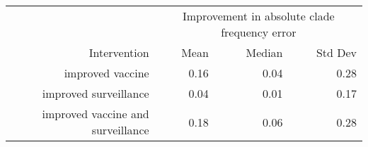 
\begin{tabular*}{0.7\textwidth}{rrrr}
\toprule
             & \multicolumn{3}{c}{Improvement in absolute clade frequency error} \\
Intervention & Mean & Median & Std Dev \\
\midrule

improved vaccine & 0.16 & 0.04 & 0.28 \\
improved surveillance & 0.04 & 0.01 & 0.17 \\
improved vaccine and surveillance & 0.18 & 0.06 & 0.28 \\

\bottomrule
\end{tabular*}

